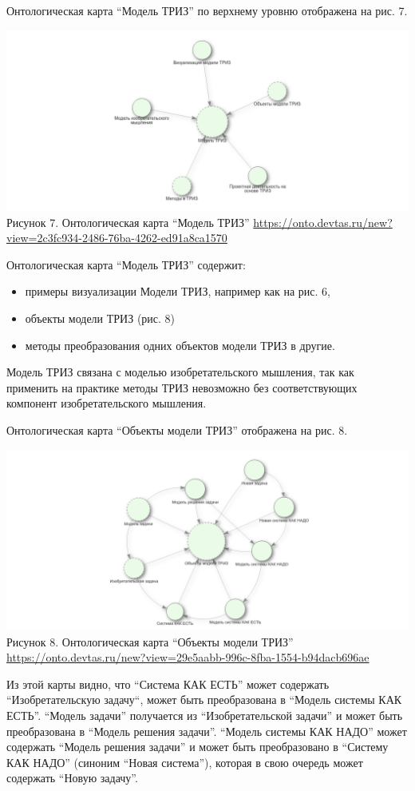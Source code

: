 \documentclass[11pt,a4paper]{article}
\begin{document}
Онтологическая карта “Модель ТРИЗ” по верхнему уровню отображена на рис. 7.
\begin{center}
  \includegraphics[width=.8\textwidth]{7.png}\\
  Рисунок 7. Онтологическая карта “Модель ТРИЗ”
  \url{https://onto.devtas.ru/new?view=2c3fc934-2486-76ba-4262-ed91a8ca1570}
\end{center}
Онтологическая карта “Модель ТРИЗ” содержит:
\begin{itemize}[noitemsep]
\item примеры визуализации Модели ТРИЗ, например как на рис. 6,
\item объекты модели ТРИЗ (рис. 8)
\item методы преобразования одних объектов модели ТРИЗ в другие.
\end{itemize}
Модель ТРИЗ связана с моделью изобретательского мышления, так как применить на
практике методы ТРИЗ невозможно без соответствующих компонент
изобретательского мышления.

Онтологическая карта “Объекты модели ТРИЗ” отображена на рис. 8.

\begin{center}
  \includegraphics[width=.8\textwidth]{8.png}\\
  Рисунок 8. Онтологическая карта “Объекты модели ТРИЗ”
  \url{https://onto.devtas.ru/new?view=29e5aabb-996c-8fba-1554-b94dacb696ae} 
\end{center}
Из этой карты видно, что “Система КАК ЕСТЬ” может содержать “Изобретательскую
задачу“, может быть преобразована в “Модель системы КАК ЕСТЬ”. “Модель задачи”
получается из “Изобретательской задачи” и может быть преобразована в “Модель
решения задачи”. “Модель системы КАК НАДО” может содержать “Модель решения
задачи” и может быть преобразовано в “Систему КАК НАДО” (синоним “Новая
система”), которая в свою очередь может содержать “Новую задачу”.
\end{document}
